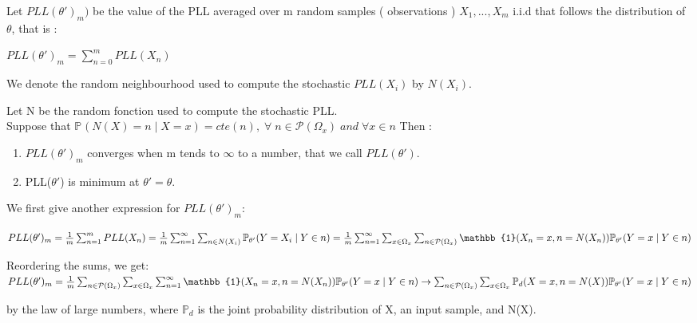 \documentclass[11 pt]{article}
\begin{document}
Let  $ PLL(\theta')_m)$ be the value of the PLL averaged over m random samples ( observations ) $X_1,...,X_m$ i.i.d that follows the distribution of $\theta$, that is : 

\quad

$PLL(\theta')_m = \sum_{n=0}^{m} PLL(X_n) $

\quad

We denote the random neighbourhood used to compute the stochastic $PLL(X_i)$ by $N(X_i)$.

\begin{theorem}
Let N be the random fonction used to compute the stochastic PLL.\\
Suppose that $\mathbb{P}_{}(N(X) = n  \mid X = x) = cte(n), \; \forall  \; n \in \mathcal{P}(\Omega_x)  \; and \; \forall x \in n$
Then : 
\begin{enumerate}
	\item $ PLL(\theta')_m $ converges when m tends to $\infty$ to a number, that we call $PLL(\theta')$.
	\item PLL($\theta'$) is minimum at $\theta' = \theta$.
\end{enumerate}

\end{theorem}

\quad 

We first give another expression for $PLL(\theta')_m$:

\quad


$PLL(\theta')_m = \frac{1}{m} \sum_{n=1}^{m} PLL(X_n)\\
		= \frac{1}{m} \sum_{n=1}^{\infty} \sum_{n \in N(X_i)}  \mathbb{P}_{\theta '} (Y=X_i \mid Y \in n) \\
		= \frac{1}{m} \sum_{n=1}^{\infty} \sum_{x \in \Omega_x} \sum_{n \in \mathcal{P}(\Omega_x)} \mathbb{1}(X_n = x, n = N(X_n) ) \mathbb{P}_{\theta '} (Y=x \mid Y \in n)
		$

\quad

Reordering the sums, we get: \\
$PLL(\theta')_m \\
		= \frac{1}{m} \sum_{n \in \mathcal{P}(\Omega_x)} \sum_{x \in \Omega_x} \sum_{n=1}^{\infty} \mathbb{1}(X_n = x, n = N(X_n) ) \mathbb{P}_{\theta '} (Y=x \mid Y \in n)
	\\	\to \sum_{n \in \mathcal{P}(\Omega_x)} \sum_{x \in \Omega_x} \mathbb{P}_d(X = x, n = N(X) ) \mathbb{P}_{\theta '} (Y=x \mid Y \in n)
		$
		
		by the law of large numbers, where $\mathbb{P}_d$ is the joint probability distribution of X, an input sample, and N(X).
\end{document}
